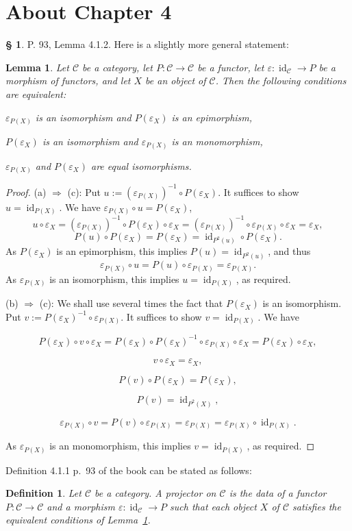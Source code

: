 \documentclass[12pt]{article}%
\newtheorem{lem}[thm]{Lemma}
\newtheorem{df}[thm]{Definition}%
\theoremstyle{remark}
\theoremstyle{definition}
\newtheorem{s}[thm]{\S}%
\newcommand{\nn}{\noindent}
\newcommand{\C}{\mathcal C}
\newcommand{\ee}{\varepsilon}
\newcommand{\then}{\Rightarrow}
\DeclareMathOperator{\id}{id}
\begin{document}

\section{About Chapter 4}

\begin{s}
P. 93, Lemma 4.1.2. Here is a slightly more general statement:

\begin{lem}\label{proj3}
Let $\C$ be a category, let $P:\C\to\C$ be a functor, let $\ee:\id_\C\to P$ be a morphism of functors, and let $X$ be an object of $\C$. Then the following conditions are equivalent:

\nn{\em(a)} $\ee_{P(X)}$ is an isomorphism and $P(\ee_X)$ is an epimorphism,

\nn{\em(b)} $P(\ee_X)$ is an isomorphism and $\ee_{P(X)}$ is an monomorphism,

\nn{\em(c)} $\ee_{P(X)}$ and $P(\ee_X)$ are equal isomorphisms.
\end{lem}

\begin{proof}
(a) $\then$ (c): Put $u:=(\ee_{P(X)})^{-1}\circ P(\ee_X)$. It suffices to show $u=\id_{P(X)}$. We have $\ee_{P(X)}\circ u=P(\ee_X)$, 
$$
u\circ\ee_X=(\ee_{P(X)})^{-1}\circ P(\ee_X)\circ\ee_X=(\ee_{P(X)})^{-1}\circ\ee_{P(X)}\circ\ee_X=\ee_X,
$$
$$
P(u)\circ P(\ee_X)=P(\ee_X)=\id_{P^2(u)}\circ P(\ee_X).
$$
As $P(\ee_X)$ is an epimorphism, this implies $P(u)=\id_{P^2(u)}$, and thus 
$$
\ee_{P(X)}\circ u=P(u)\circ \ee_{P(X)}=\ee_{P(X)}.
$$ 
As $\ee_{P(X)}$ is an isomorphism, this implies $u=\id_{P(X)}$, as required.

\nn(b) $\then$ (c): We shall use several times the fact that $P(\ee_X)$ is an isomorphism. Put $v:=P(\ee_X)^{-1}\circ\ee_{P(X)}$. It suffices to show $v=\id_{P(X)}$. We have 

$$
P(\ee_X)\circ v\circ\ee_X=P(\ee_X)\circ P(\ee_X)^{-1}\circ\ee_{P(X)}\circ\ee_X=P(\ee_X)\circ\ee_X,
$$ 

$$
v\circ\ee_X=\ee_X,
$$

$$
P(v)\circ P(\ee_X)=P(\ee_X),
$$

$$
P(v)=\id_{P^2(X)},
$$

$$
\ee_{P(X)}\circ v=P(v)\circ\ee_{P(X)}=\ee_{P(X)}=\ee_{P(X)}\circ\id_{P(X)}.
$$ 

\nn As $\ee_{P(X)}$ is an monomorphism, this implies $v=\id_{P(X)}$, as required.
\end{proof}

Definition 4.1.1 p.~93 of the book can be stated as follows:

\begin{df}
Let $\C$ be a category. A {\em projector}  on $\C$ is the data of a functor $P:\C\to\C$ and a morphism $\ee:\id_\C\to P$ such that each object $X$ of $\C$ satisfies the equivalent conditions of Lemma~\ref{proj3}. 
\end{df}
\end{s}
\end{document}
